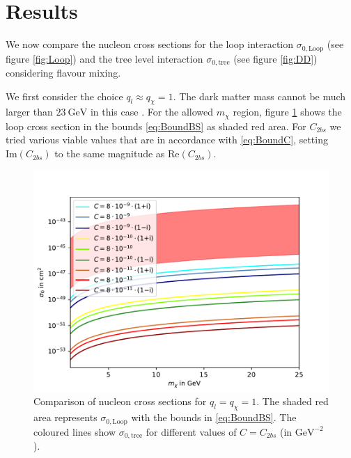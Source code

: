 \section{Results}
We now compare the nucleon cross sections for the loop interaction $\sigma_{0,\text{Loop}}$ (see figure \ref{fig:Loop}) and the tree level interaction $\sigma_{0,\text{tree}}$ (see figure \ref{fig:DD}) considering flavour mixing.

We first consider the choice $q_l\approx q_\chi= 1$. The dark matter mass cannot be much larger than $\SI{23}{\giga\electronvolt}$ in this case \cite{Z}. For the allowed $m_\chi$ region, figure \ref{fig:Allgemein11} shows the loop cross section in the bounds \eqref{eq:BoundBS} as shaded red area. For $C_{2bs}$ we tried various viable values that are in accordance with \eqref{eq:BoundC}, setting $\text{Im}(C_{2bs})$ to the same magnitude as $\text{Re}(C_{2bs})$.
\begin{figure}
	\centering
	\includegraphics[scale=.8]{content/graphics/Allgemein11.pdf}
	\caption{Comparison of nucleon cross sections for $q_l=q_\chi=1$. The shaded red area represents $\sigma_{0,\text{Loop}}$ with the bounds in \eqref{eq:BoundBS}. The coloured lines show $\sigma_{0,\text{tree}}$ for different values of $C = C_{2bs}$ (in $\si{\giga\electronvolt}^{-2}$).}
	\label{fig:Allgemein11}
\end{figure}



